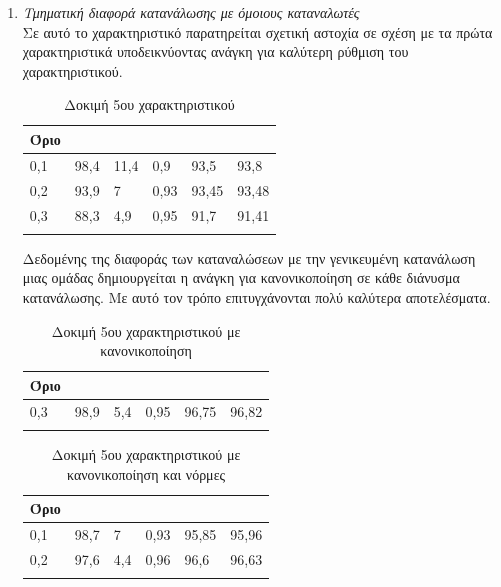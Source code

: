 \begin{enumerate}
\item{\textit{Τμηματική διαφορά κατανάλωσης με όμοιους καταναλωτές}} \\
Σε αυτό το χαρακτηριστικό παρατηρείται σχετική αστοχία σε σχέση με τα πρώτα χαρακτηριστικά υποδεικνύοντας ανάγκη για καλύτερη ρύθμιση του χαρακτηριστικού. 
\begin{center}
\begin{longtabu} to 0.8\textwidth { | X[c] || X[c] | X[c] | X[c] | X[c] | X[c] |  }
 \hline
  Όριο &   &  &  &  & \\
 ,1&	98,4&	11,4&	0,9&	93,5&	93,8\\
0,2&	93,9&	7&	0,93&	93,45	&93,48\\
0,3&	88,3&	4,9&	0,95&	91,7	&91,41\\
\hline
\caption{Δοκιμή 5ου χαρακτηριστικού}
\label{testfeat5}
\end{longtabu}
\end{center}
Δεδομένης της διαφοράς των καταναλώσεων με την γενικευμένη κατανάλωση μιας ομάδας δημιουργείται η ανάγκη για κανονικοποίηση σε κάθε διάνυσμα κατανάλωσης. Με αυτό τον τρόπο επιτυγχάνονται πολύ καλύτερα αποτελέσματα.
\begin{center}
\begin{longtabu} to 0.8\textwidth { | X[c] || X[c] | X[c] | X[c] | X[c] | X[c] |  }
 \hline
  Όριο &   &  &  &  & \\
 ,3&	98,9&	5,4&	0,95&	96,75&	96,82\\
\hline
\caption{Δοκιμή 5ου χαρακτηριστικού με κανονικοποίηση}
\label{testfeat5normalized}
\end{longtabu}
\end{center}

\begin{center}
\begin{longtabu} to 0.8\textwidth { | X[c] || X[c] | X[c] | X[c] | X[c] | X[c] |  }
 \hline
  Όριο &   &  &  &  & \\
 ,1&	98,7&	7&	0,93&	95,85&	95,96\\
0,2&	97,6&	4,4&	0,96&	96,6&	96,63\\
\hline
\caption{Δοκιμή 5ου χαρακτηριστικού με κανονικοποίηση και νόρμες}
\label{testfeat5normalizednorms}
\end{longtabu}
\end{center}


\end{enumerate}

